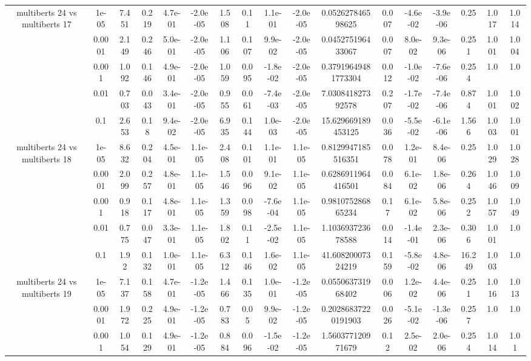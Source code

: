 \begin{tabular}{|c|c|c|c|c|c|c|c|c|c|c|c|c|c|c|c|c|}
\hline
\multirow{5}{*}{multiberts 24 vs multiberts 17} & 1e-05 & 7.451 & 0.219 & 4.7e-01 & -2.0e-05 & 1.508 & 0.11 & 1.1e-01 & -2.0e-05 & 0.052627846598625 & 0.007 & -4.6e-02 & -3.9e-06 & 0.25 & 1.017 & 1.014 \\
 & 0.0001 & 2.149 & 0.246 & 5.0e-01 & -2.0e-05 & 1.106 & 0.107 & 9.9e-02 & -2.0e-05 & 0.045275196433067 & 0.007 & 8.0e-02 & 9.3e-06 & 0.251 & 1.001 & 1.004 \\
 & 0.001 & 1.092 & 0.146 & 4.9e-01 & -2.0e-05 & 1.059 & 0.095 & -1.8e-02 & -2.0e-05 & 0.37919649481773304 & 0.012 & -1.0e-02 & -7.6e-06 & 0.254 & 1.0 & 1.0 \\
 & 0.01 & 0.703 & 0.043 & 3.4e-01 & -2.0e-05 & 0.955 & 0.061 & -7.4e-03 & -2.0e-05 & 7.030841827392578 & 0.207 & -1.7e-02 & -7.4e-06 & 0.874 & 1.001 & 1.002 \\
 & 0.1 & 2.653 & 0.18 & 9.4e-02 & -2.0e-05 & 6.935 & 0.144 & 1.0e-03 & -2.0e-05 & 15.629669189453125 & 0.036 & -5.5e-02 & -6.1e-06 & 1.566 & 1.003 & 1.001 \\
\hline
\multirow{5}{*}{multiberts 24 vs multiberts 18} & 1e-05 & 8.632 & 0.204 & 4.5e-01 & 1.1e-05 & 2.408 & 0.101 & 1.1e-01 & 1.1e-05 & 0.8129947185516351 & 0.078 & 1.2e-01 & 8.4e-06 & 0.25 & 1.029 & 1.028 \\
 & 0.0001 & 2.099 & 0.257 & 4.8e-01 & 1.1e-05 & 1.546 & 0.096 & 9.1e-02 & 1.1e-05 & 0.6286911964416501 & 0.084 & 6.1e-02 & 1.8e-06 & 0.264 & 1.046 & 1.009 \\
 & 0.001 & 0.918 & 0.117 & 4.8e-01 & 1.1e-05 & 1.359 & 0.098 & -7.6e-04 & 1.1e-05 & 0.981075286865234 & 0.17 & 6.1e-02 & 5.8e-06 & 0.252 & 1.057 & 1.049 \\
 & 0.01 & 0.775 & 0.047 & 3.3e-01 & 1.1e-05 & 1.802 & 0.11 & -2.5e-02 & 1.1e-05 & 1.103693723678588 & 0.014 & -1.4e-01 & 2.3e-06 & 0.306 & 1.001 & 1.0 \\
 & 0.1 & 1.92 & 0.132 & 1.0e-01 & 1.1e-05 & 6.312 & 0.146 & 1.6e-02 & 1.1e-05 & 41.60820007324219 & 0.159 & -5.8e-02 & 4.8e-06 & 16.249 & 1.003 & 1.0 \\
\hline
\multirow{5}{*}{multiberts 24 vs multiberts 19} & 1e-05 & 7.137 & 0.158 & 4.7e-01 & -1.2e-05 & 1.466 & 0.135 & 1.0e-01 & -1.2e-05 & 0.055063731968402 & 0.006 & 1.2e-02 & 4.4e-06 & 0.251 & 1.016 & 1.013 \\
 & 0.0001 & 1.972 & 0.225 & 4.9e-01 & -1.2e-05 & 0.783 & 0.05 & 9.9e-02 & -1.2e-05 & 0.20286837220191903 & 0.026 & -5.1e-02 & -1.3e-06 & 0.257 & 1.0 & 1.0 \\
 & 0.001 & 1.054 & 0.129 & 4.9e-01 & -1.2e-05 & 0.884 & 0.096 & -1.5e-02 & -1.2e-05 & 1.560377120971679 & 0.12 & 2.5e-02 & 2.0e-06 & 0.254 & 1.014 & 1.01 \\

\end{tabular}
